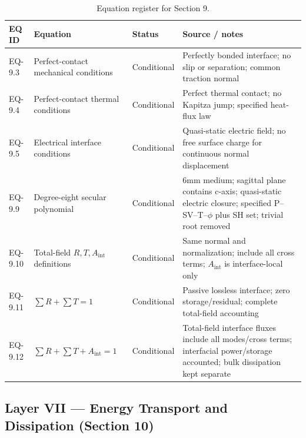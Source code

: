 \begin{table}[htbp]
\centering
\small
\caption{Equation register for Section 9.}
\label{tab:appA-sec9}
\begin{tabularx}{\textwidth}{@{}p{1.6cm}Y p{2.8cm}Y@{}}
\toprule
\textbf{EQ ID} & \textbf{Equation} & \textbf{Status} & \textbf{Source / notes} \\
\midrule
EQ-9.3 & Perfect-contact mechanical conditions & Conditional & Perfectly bonded interface; no slip or separation; common traction normal \\
EQ-9.4 & Perfect-contact thermal conditions & Conditional & Perfect thermal contact; no Kapitza jump; specified heat-flux law \\
EQ-9.5 & Electrical interface conditions & Conditional & Quasi-static electric field; no free surface charge for continuous normal displacement \\
EQ-9.9 & Degree-eight secular polynomial & Conditional & 6mm medium; sagittal plane contains c-axis; quasi-static electric closure; specified P--SV--T--$\phi$ plus SH set; trivial root removed \\
EQ-9.10 & Total-field $R,T,A_{\mathrm{int}}$ definitions & Conditional & Same normal and normalization; include all cross terms; $A_{\mathrm{int}}$ is interface-local only \\
EQ-9.11 & $\sum R+\sum T=1$ & Conditional & Passive lossless interface; zero storage/residual; complete total-field accounting \\
EQ-9.12 & $\sum R+\sum T+A_{\mathrm{int}}=1$ & Conditional & Total-field interface fluxes include all modes/cross terms; interfacial power/storage accounted; bulk dissipation kept separate \\
\bottomrule
\end{tabularx}
\end{table}

\subsection{Layer VII — Energy Transport and Dissipation (Section 10)}

